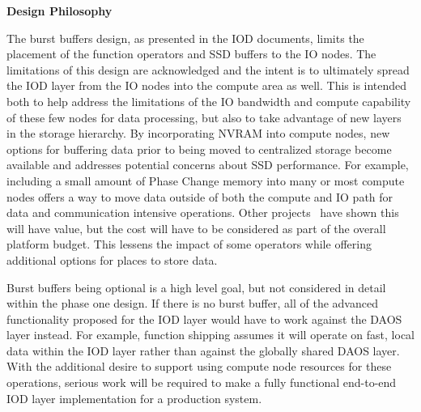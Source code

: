 \documentclass[conference]{IEEEtran}
\begin{document}
\noindent\textbf{Design Philosophy}

The burst buffers design, as presented in the IOD documents, limits the
placement of the function operators and SSD buffers to the IO nodes. The
limitations of this design are acknowledged and the intent is to ultimately
spread the IOD layer from the IO nodes into the compute area as well.  This is
intended both to help address the limitations of the IO bandwidth and compute
capability of these few nodes for data processing, but also to take advantage
of new layers in the storage hierarchy. By incorporating NVRAM into compute
nodes, new options for buffering data prior to being moved to centralized
storage become available and addresses potential concerns about SSD
performance. For example, including a small amount of Phase Change memory into
many or most compute nodes offers a way to move data outside of both the
compute and IO path for data and communication intensive operations. Other
projects~\cite{zheng:2010:predata} have shown this will have value, but the
cost will have to be considered as part of the overall platform budget. This
lessens the impact of some operators while offering additional options for
places to store data.

Burst buffers being optional is a high level goal, but not considered in detail
within the phase one design. If there is no burst buffer, all of the advanced
functionality proposed for the IOD layer would have to work against the DAOS
layer instead. For example, function shipping assumes it will operate on fast,
local data within the IOD layer rather than against the globally shared DAOS
layer. With the additional desire to support using compute node resources for
these operations, serious work will be required to make a fully functional
end-to-end IOD layer implementation for a production system.

\end{document}
